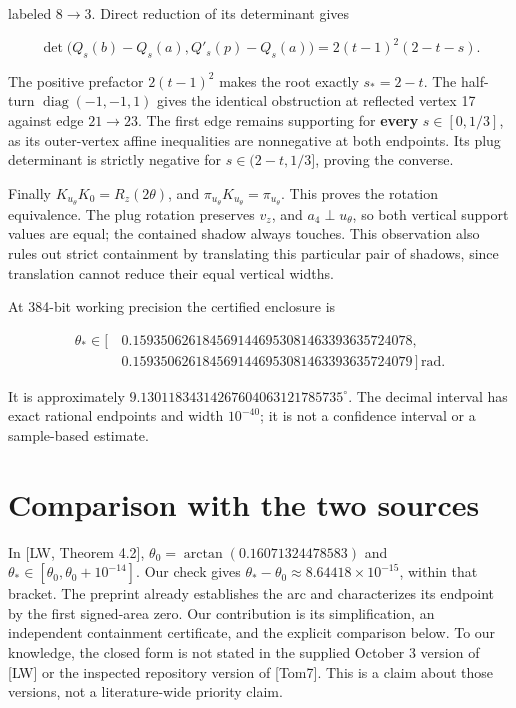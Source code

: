 \documentclass[
  10pt,
  a4paper,
]{article}
\begin{document}
labeled \(8\to3\). Direct reduction of its determinant gives

\[\det\bigl(Q_s(b)-Q_s(a),Q'_s(p)-Q_s(a)\bigr)
=2(t-1)^2(2-t-s).\]

The positive prefactor \(2(t-1)^2\) makes the root exactly \(s_*=2-t\).
The half-turn \(\operatorname{diag}(-1,-1,1)\) gives the identical
obstruction at reflected vertex 17 against edge \(21\to23\). The first
edge remains supporting for \textbf{every} \(s\in[0,1/3]\), as its
outer-vertex affine inequalities are nonnegative at both endpoints. Its
plug determinant is strictly negative for \(s\in(2-t,1/3]\), proving the
converse.

Finally \(K_{u_\theta}K_0=R_z(2\theta)\), and
\(\pi_{u_\theta}K_{u_\theta}=\pi_{u_\theta}\). This proves the rotation
equivalence. The plug rotation preserves \(v_z\), and
\(a_4\perp u_\theta\), so both vertical support values are equal; the
contained shadow always touches. This observation also rules out strict
containment by translating this particular pair of shadows, since
translation cannot reduce their equal vertical widths.

At 384-bit working precision the certified enclosure is

\[\begin{aligned}
\theta_*\in[\,&0.1593506261845691446953081463393635724078,\\
&0.1593506261845691446953081463393635724079\,]\,\mathrm{rad}.
\end{aligned}\]

It is approximately \(9.13011834314267604063121785735^\circ\). The
decimal interval has exact rational endpoints and width \(10^{-40}\); it
is not a confidence interval or a sample-based estimate.

\newpage

\section{Comparison with the two
sources}\label{comparison-with-the-two-sources}

In {[}LW, Theorem 4.2{]}, \(\theta_0=\arctan(0.16071324478583)\) and
\(\theta_*\in[\theta_0,\theta_0+10^{-14}]\). Our check gives
\(\theta_*-\theta_0\approx8.64418\times10^{-15}\), within that bracket.
The preprint already establishes the arc and characterizes its endpoint
by the first signed-area zero. Our contribution is its simplification,
an independent containment certificate, and the explicit comparison
below. To our knowledge, the closed form is not stated in the supplied
October 3 version of {[}LW{]} or the inspected repository version of
{[}Tom7{]}. This is a claim about those versions, not a literature-wide
priority claim.
\end{document}

